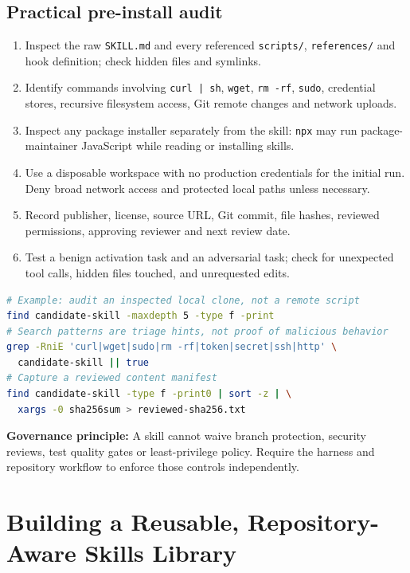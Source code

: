 \documentclass[11pt,letterpaper]{article}
\begin{document}
\subsection{Practical pre-install audit}
\begin{enumerate}
\item Inspect the raw \texttt{SKILL.md} and every referenced \texttt{scripts/}, \texttt{references/} and hook definition; check hidden files and symlinks.
\item Identify commands involving \texttt{curl | sh}, \texttt{wget}, \texttt{rm -rf}, \texttt{sudo}, credential stores, recursive filesystem access, Git remote changes and network uploads.
\item Inspect any package installer separately from the skill: \texttt{npx} may run package-maintainer JavaScript while reading or installing skills.
\item Use a disposable workspace with no production credentials for the initial run. Deny broad network access and protected local paths unless necessary.
\item Record publisher, license, source URL, Git commit, file hashes, reviewed permissions, approving reviewer and next review date.
\item Test a benign activation task and an adversarial task; check for unexpected tool calls, hidden files touched, and unrequested edits.
\end{enumerate}
\begin{lstlisting}[language=bash]
# Example: audit an inspected local clone, not a remote script
find candidate-skill -maxdepth 5 -type f -print
# Search patterns are triage hints, not proof of malicious behavior
grep -RniE 'curl|wget|sudo|rm -rf|token|secret|ssh|http' \
  candidate-skill || true
# Capture a reviewed content manifest
find candidate-skill -type f -print0 | sort -z | \
  xargs -0 sha256sum > reviewed-sha256.txt
\end{lstlisting}
\textbf{Governance principle:} A skill cannot waive branch protection, security reviews, test quality gates or least-privilege policy. Require the harness and repository workflow to enforce those controls independently.

\section{Building a Reusable, Repository-Aware Skills Library}
\end{document}
